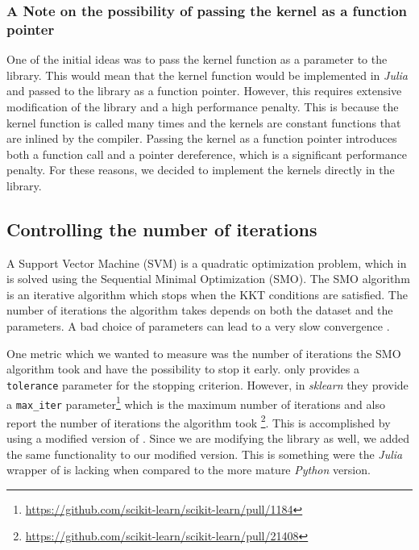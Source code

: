 \subsubsection{A Note on the possibility of passing the kernel as a function pointer}

One of the initial ideas was to pass the kernel function as a parameter to the
library. This would mean that the kernel function would be implemented in
\emph{Julia} and passed to the library as a function pointer. However, this
requires extensive modification of the library and a high performance
penalty. This is because the kernel function is called many times and the
\libsvm kernels are constant functions that are inlined by the
compiler. Passing the kernel as a function pointer introduces both a function
call and a pointer dereference, which is a significant performance penalty. For
these reasons, we decided to implement the kernels directly in the library.

\subsection{Controlling the number of iterations}

A Support Vector Machine (SVM) is a quadratic optimization problem, which
in \libsvm is solved using the Sequential Minimal Optimization (SMO).
The SMO algorithm is an iterative algorithm which stops when the KKT conditions
are satisfied. The number of iterations the algorithm takes depends on both
the dataset and the parameters. A bad choice of parameters can lead to a very
slow convergence \cite{CC01a}.

One metric which we wanted to measure was the number of iterations the SMO
algorithm took and have the possibility to stop it early.
\libsvm only provides a \texttt{tolerance} parameter for the stopping
criterion. However, in \emph{sklearn} they provide a \texttt{max\_iter}
parameter\footnote{\url{https://github.com/scikit-learn/scikit-learn/pull/1184}}
which is the maximum number of iterations and also report the number of
iterations the algorithm took
\footnote{\url{https://github.com/scikit-learn/scikit-learn/pull/21408}}. This
is accomplished by using a modified version of \libsvm{}. Since we are
modifying the library as well, we added the same functionality to our modified
version. This is something were the \emph{Julia} wrapper of \libsvm is
lacking when compared to the more mature \emph{Python} version.

\pagebreak %
